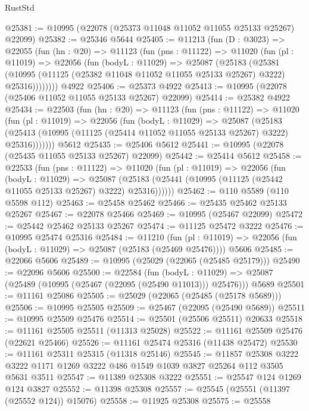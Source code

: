 \begin{lexlean}{RustStd}
\begin{coremodule}
@25381 := @10995 (@22078 (@25373 @11048 @11052 @11055 @25133 @25267) @22099)
@25382 := @25346 @5644
@25405 := @11213
    (fun (D : @3023) =>
    @22055
      (fun (hn : @20) =>
      @11123
        (fun (pns : @11122) =>
        @11020
          (fun (pl : @11019) =>
          @22056
            (fun (bodyL : @11029) =>
            @25087
              (@25183
                (@25381
                  (@10995 (@11125 (@25382 @11048 @11052 @11055 @25133 @25267) @3222) @25316))))))))
    @4922
@25406 := @25373 @4922
@25413 := @10995 (@22078 (@25406 @11052 @11055 @25133 @25267) @22099)
@25414 := @25382 @4922
@25434 := @22503
    (fun (hn : @20) =>
    @11123
      (fun (pns : @11122) =>
      @11020
        (fun (pl : @11019) =>
        @22056
          (fun (bodyL : @11029) =>
          @25087
            (@25183
              (@25413 (@10995 (@11125 (@25414 @11052 @11055 @25133 @25267) @3222) @25316)))))))
    @5612
@25435 := @25406 @5612
@25441 := @10995 (@22078 (@25435 @11055 @25133 @25267) @22099)
@25442 := @25414 @5612
@25458 := @22533
    (fun (pns : @11122) =>
    @11020
      (fun (pl : @11019) =>
      @22056
        (fun (bodyL : @11029) =>
        @25087 (@25183 (@25441 (@10995 (@11125 (@25442 @11055 @25133 @25267) @3222) @25316))))))
@25462 := @110 @5589 (@110 @5598 @112)
@25463 := @25458 @25462
@25466 := @25435 @25462 @25133 @25267
@25467 := @22078 @25466
@25469 := @10995 (@25467 @22099)
@25472 := @25442 @25462 @25133 @25267
@25474 := @11125 @25472 @3222
@25476 := @10995 @25474 @25316
@25484 := @11210
    (fun (pl : @11019) => @22056 (fun (bodyL : @11029) => @25087 (@25183 (@25469 @25476))))
    @5606
@25485 := @22066 @5606
@25489 := @10995 (@25029 (@22065 (@25485 @25179)))
@25490 := @22096 @5606
@25500 := @22584
    (fun (bodyL : @11029) => @25087 (@25489 (@10995 (@25467 (@22095 (@25490 @11013))) @25476)))
    @5689
@25501 := @11161 @25086
@25505 := @25029 (@22065 (@25485 (@25178 @5689)))
@25506 := @10995 @25505
@25509 := @25467 (@22095 (@25490 @5689))
@25511 := @10995 @25509 @25476
@25514 := @25501 (@25506 @25511) @20633
@25518 := @11161 @25505 @25511 (@11313 @25028)
@25522 := @11161 @25509 @25476 (@22621 @25466)
@25526 := @11161 @25474 @25316 (@11438 @25472)
@25530 := @11161 @25311 @25315 (@11318 @25146)
@25545 := @11857
    @25308
    @3222
    @3222
    @1171
    @1269
    @3222
    @486
    @1549
    @1039
    @3827
    @25264
    @112
    @3505
    @5631
    @3511
@25547 := @11389 @25308 @3222
@25551 := @25547 @124 @1269 @124 @3827
@25552 := @11398 @25308
@25557 := @25545 (@25551 (@11397 (@25552 @124)) @15076)
@25558 := @11925 @25308
@25575 := @25558

\end{coremodule}
\end{lexlean}
